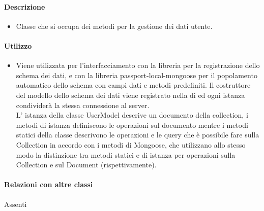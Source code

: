 \paragraph*{Descrizione}
\begin{itemize}
\item[] Classe che si occupa dei metodi per la gestione dei dati utente. 
\end{itemize}

\paragraph*{Utilizzo}
\begin{itemize}
\item[] Viene utilizzata per l'interfacciamento con la libreria  per la registrazione dello schema dei dati, e con la libreria passport-local-mongoose per il popolamento automatico dello schema con campi dati e metodi predefiniti.
Il costruttore del modello dello schema dei dati viene registrato nella  di  ed ogni istanza condividerà la stessa connessione al server. \\
L' istanza della classe UserModel descrive un documento della collection, i metodi di istanza definiscono le operazioni sul documento mentre i metodi statici della classe descrivono le operazioni e le query che è possibile fare sulla Collection in accordo con i metodi di Mongoose, che utilizzano allo stesso modo la distinzione tra metodi statici e di istanza per operazioni sulla Collection e sul Document (rispettivamente).

\end{itemize}

\paragraph*{Relazioni con altre classi}
Assenti

